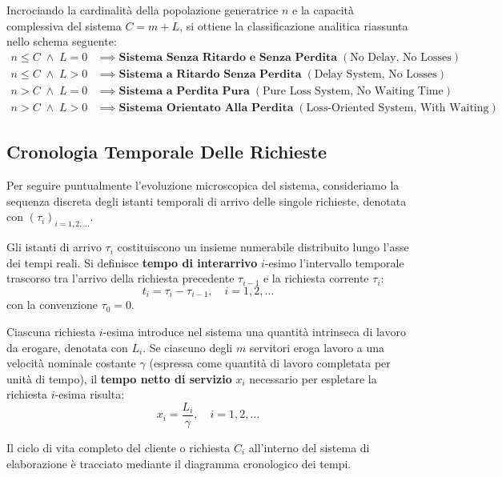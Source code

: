 \documentclass[11pt, a4paper]{article}
\begin{document}
Incrociando la cardinalità della popolazione generatrice $n$ e la capacità complessiva del sistema $C = m + L$, si ottiene la classificazione analitica riassunta nello schema seguente:
\begin{align*}
    n \le C \;\land\; L = 0 &\implies \textbf{Sistema Senza Ritardo e Senza Perdita} \; (\text{No Delay, No Losses}) \\
    n \le C \;\land\; L > 0 &\implies \textbf{Sistema a Ritardo Senza Perdita} \; (\text{Delay System, No Losses}) \\
    n > C \;\land\; L = 0 &\implies \textbf{Sistema a Perdita Pura} \; (\text{Pure Loss System, No Waiting Time}) \\
    n > C \;\land\; L > 0 &\implies \textbf{Sistema Orientato Alla Perdita} \; (\text{Loss-Oriented System, With Waiting})
\end{align*}

\subsection{Cronologia Temporale Delle Richieste}

Per seguire puntualmente l'evoluzione microscopica del sistema, consideriamo la sequenza discreta degli istanti temporali di arrivo delle singole richieste, denotata con $(\tau_i)_{i=1, 2, \dots}$.


Gli istanti di arrivo $\tau_i$ costituiscono un insieme numerabile distribuito lungo l'asse dei tempi reali. Si definisce \textbf{tempo di interarrivo} $i$-esimo l'intervallo temporale trascorso tra l'arrivo della richiesta precedente $\tau_{i-1}$ e la richiesta corrente $\tau_i$:
\[
    \boxed{t_i = \tau_i - \tau_{i-1}, \quad i = 1, 2, \dots}
\]
con la convenzione $\tau_0 = 0$.

Ciascuna richiesta $i$-esima introduce nel sistema una quantità intrinseca di lavoro da erogare, denotata con $L_i$. Se ciascuno degli $m$ servitori eroga lavoro a una velocità nominale costante $\gamma$ (espressa come quantità di lavoro completata per unità di tempo), il \textbf{tempo netto di servizio} $x_i$ necessario per espletare la richiesta $i$-esima risulta:
\[
    \boxed{x_i = \frac{L_i}{\gamma}, \quad i = 1, 2, \dots}
\]

Il ciclo di vita completo del cliente o richiesta $C_i$ all'interno del sistema di elaborazione è tracciato mediante il diagramma cronologico dei tempi.
\end{document}

